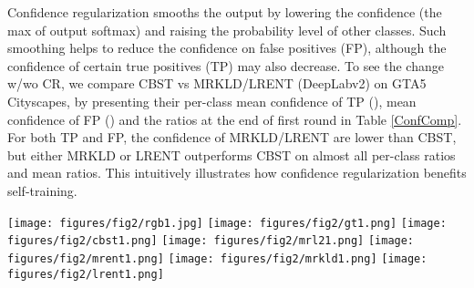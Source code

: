 \documentclass[10pt,twocolumn,letterpaper]{article}
\theoremstyle{plain}
\begin{document}
Confidence regularization smooths the output by lowering the confidence (the max of output softmax) and raising the probability level of other classes. Such smoothing helps to reduce the confidence on false positives (FP), although the confidence of certain true positives (TP) may also decrease. To see the change w/wo CR, we compare CBST vs MRKLD/LRENT (DeepLabv2) on GTA5  Cityscapes, by presenting their per-class mean confidence of TP (), mean confidence of FP () and the  ratios at the end of first round in Table \ref{ConfComp}. For both TP and FP, the confidence of MRKLD/LRENT are lower than CBST, but either MRKLD or LRENT outperforms CBST on almost all per-class ratios and mean ratios. This intuitively illustrates how confidence regularization benefits self-training.
\begin{figure*}[!t]
	\centering
	\vspace{0.5mm}
	\texttt{[image: figures/fig2/rgb1.jpg]}
	\texttt{[image: figures/fig2/gt1.png]}
	\texttt{[image: figures/fig2/cbst1.png]}
	\texttt{[image: figures/fig2/mrl21.png]}
	\texttt{[image: figures/fig2/mrent1.png]}
	\texttt{[image: figures/fig2/mrkld1.png]}
	\texttt{[image: figures/fig2/lrent1.png]}\\

\end{figure*}
\end{document}
